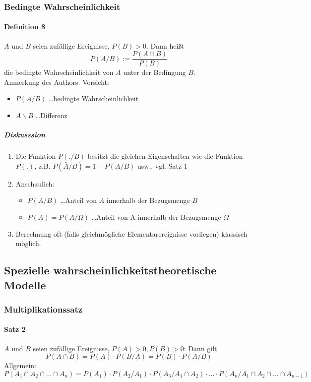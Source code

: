 \documentclass[a4paper]{scrartcl}
\begin{document}
\subsubsection{Bedingte Wahrscheinlichkeit}
\paragraph{Definition 8} $A$ und $B$ seien zufällige Ereignisse, $P(B) > 0$. Dann heißt
\[ P(A / B) := \frac{P(A\cap B)}{P(B)} \]
die bedingte Wahrscheinlichkeit von $A$ unter der Bedingung $B$.\\
Anmerkung des Authors: Vorsicht:
\begin{itemize}
\item $P(A / B)$ \dots bedingte Wahrscheinlichkeit
\item $A \backslash B$ \dots Differenz
\end{itemize}

\subparagraph{Diskusssion}
\begin{enumerate}
\item Die Funktion $P(. / B)$ besitzt die gleichen Eigenschaften wie die Funktion $P(.)$, z.B. $P(\bar{A} / B) = 1 - P(A / B)$ usw., vgl. Satz 1
\item Anschaulich:
    \begin{itemize}
    \item $P(A / B)$ \dots Anteil von $A$ innerhalb der Bezugsmenge $B$
    \item $P(A) = P(A / \Omega)$ \dots Anteil von A innerhalb der Bezugsmenge $\Omega$
    \end{itemize}
\item Berechnung oft (falls gleichmögliche Elementarereignisse vorliegen) klassisch möglich.
\end{enumerate}

\subsection{Spezielle wahrscheinlichkeitstheoretische Modelle}
\subsubsection{Multiplikationssatz}
\paragraph{Satz 2} $A$ und $B$ seien zufällige Ereignisse, $P(A) > 0, P(B) >0$: Dann gilt
\[ P(A\cap B) = P(A) \cdot P(B / A) = P(B) \cdot P(A / B)\]
Allgemein: $P(A_1 \cap A_2 \cap \dots \cap A_n) = P(A_1) \cdot P(A_2 / A_1) \cdot P(A_3 / A_1 \cap A_2) \cdot \dots \cdot P(A_n / A_1 \cap A_2 \cap \dots \cap A_{n-1})$
\end{document}
